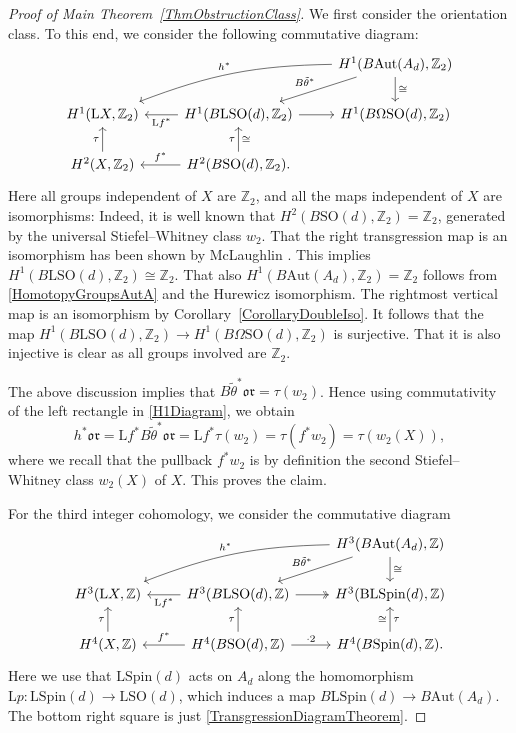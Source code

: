 \documentclass[10pt,a4paper]{amsart}
\numberwithin{equation}{section}
\newcommand{\Z}{\mathbb{Z}}
\newcommand{\B}{\mathrm{B}}
\newcommand{\SO}{\mathrm{SO}}
\newcommand{\Aut}{\mathrm{Aut}}
\newcommand{\Spin}{\mathrm{Spin}}
\renewcommand{\L}{\mathrm{L}}
\newcommand{\oclass}{\mathfrak{or}}
\begin{document}
\begin{proof}[Proof of Main Theorem~\ref{ThmObstructionClass}]
We first consider the orientation class.
To this end, we consider the following commutative diagram:
\begin{equation} \label{H1Diagram}
\begin{tikzcd}
 & & H^{1}(B\Aut(A_d), \Z_2) \ar[dl, "B\tilde{\theta}^*"'] \ar[d, "\cong"] \ar[dll, "h^*"', bend right=10]\\
 H^{1}(\L X, \Z_2) & \ar[l, "\L f^*"] H^{1}(B\L \SO(d), \Z_2) \ar[r] & H^{1}(B\Omega\SO(d), \Z_2) \\
 H^2(X, \Z_2) \ar[u, "\tau"] & \ar[l, "f^*"'] H^2(B\SO(d), \Z_2) \ar[u, "\tau", "\cong"'].
\end{tikzcd}
\end{equation}
Here all groups independent of $X$ are $\Z_2$, and all the maps independent of $X$ are isomorphisms:
Indeed, it is well known that $H^2(B\SO(d), \Z_2) = \Z_2$, generated by the universal Stiefel--Whitney class $w_2$.
That the right transgression map is an isomorphism has been shown by McLaughlin \cite[proof of Proposition~2.1]{McLaughlin}. This implies $H^{1}(B\L \SO(d), \Z_2) \cong \Z_2$.
That also ${H^1(B\Aut(A_d), \Z_2) = \Z_2}$ follows from \eqref{HomotopyGroupsAutA} and the Hurewicz isomorphism.
The rightmost vertical map is an isomorphism by Corollary~\ref{CorollaryDoubleIso}.
It follows that the map $H^{1}(B\L \SO(d), \Z_2) \to H^{1}(B\Omega\SO(d), \Z_2)$ is surjective.
That it is also injective is clear as all groups involved are $\Z_2$.

The above discussion implies that $B\tilde{\theta}^* \oclass = \tau(w_2)$.
Hence using commutativity of the left rectangle in \eqref{H1Diagram}, we obtain
\begin{equation*}
 h^* \oclass = \L f^*B\tilde{\theta}^*\oclass = \L f^* \tau(w_2) = \tau(f^*w_2) = \tau(w_2(X)),
\end{equation*}
where we recall that the pullback $f^*w_2$ is by definition the second Stiefel--Whitney class $w_2(X)$ of $X$.
This proves the claim.

For the third integer cohomology, we consider the commutative diagram
\begin{equation} \label{H3Diagram}
\begin{tikzcd}
 & & H^{3}(B\Aut(A_d), \Z) \ar[dl, "B\tilde{\theta}^*"'] \ar[dll, "h^*"', bend right = 10] \ar[d, "\cong"] \\
 H^{3}(\L X, \Z) & \ar[l, "\L f^*"] H^{3}(B\L \SO(d), \Z) \ar[r, two heads] & H^{3}(\B\L\Spin(d), \Z) \\
 H^4(X, \Z) \ar[u, "\tau"] & \ar[l, "f^*"'] H^4(B\SO(d), \Z) \ar[u, "\tau"] \ar[r, "\cdot 2"] & H^4(B \Spin(d), \Z). \ar[u, "\tau"', "\cong"]
\end{tikzcd}
\end{equation}
Here we use that $\L\Spin(d)$ acts on $A_d$ along the homomorphism $\L p\colon \L\Spin(d) \to \L\SO(d)$, which induces a map $B\L\Spin(d) \to B\Aut(A_d)$.
The bottom right square is just \eqref{TransgressionDiagramTheorem}.


\end{proof}
\end{document}
